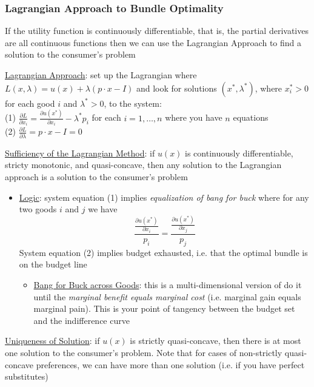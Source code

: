 \documentclass{article}
\begin{document}
\subsubsection{Lagrangian Approach to Bundle Optimality}
If the utility function is continuously differentiable, that is, the partial derivatives are all continuous functions then we can use the Lagrangian Approach to find a solution to the consumer's problem \par \vspace{0.3em}
  \underline{Lagrangian Approach}: set up the Lagrangian where $L(x, \lambda) = u(x) + \lambda (p \cdot x - I)$ and look for solutions $(x^{*}, \lambda^{*})$, where $x_{i}^{*} > 0$ for each good $i$ and $\lambda^{*} > 0$, to the system: \\
  \quad (1) $\tfrac{\partial L}{\partial x_{i}} = \tfrac{\partial u(x^{*})}{\partial x_{i}} - \lambda^{*}p_{i}$ \quad for each $i = 1, \dots, n$ where you have $n$ equations \\
  \quad (2) $\tfrac{\partial L}{\partial \lambda} = p \cdot x - I = 0$
  \par
  \underline{Sufficiency of the Lagrangian Method}: if $u(x)$ is continuously differentiable, stricty monotonic, and quasi-concave, then any solution to the Lagrangian approach is a solution to the consumer's problem
  \begin{itemize}
    \item  \underline{Logic}: system equation (1) implies \textit{equalization of bang for buck} where for any two goods $i$ and $j$ we have $$\frac{\tfrac{\partial u(x^{*})}{\partial x_{i}}}{p_{i}} = \frac{\tfrac{\partial u(x^{*})}{\partial x_{j}}}{p_{j}}$$ System equation (2) implies budget exhausted, i.e. that the optimal bundle is on the budget line
    \begin{itemize}
      \item  \underline{Bang for Buck across Goods}: this is a multi-dimensional version of do it until the \textit{marginal benefit equals marginal cost} (i.e. marginal gain equals marginal pain). This is your point of tangency between the budget set and the indifference curve
    \end{itemize}
  \end{itemize}
  \par
  \underline{Uniqueness of Solution}: if $u(x)$ is strictly quasi-concave, then there is at most one solution to the consumer's problem. Note that for cases of non-strictly quasi-concave preferences, we can have more than one solution (i.e. if you have perfect substitutes)
\end{document}
